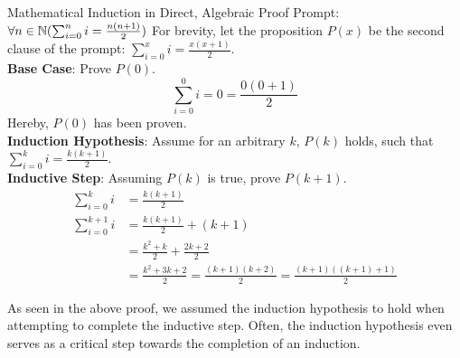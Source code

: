 \begin{ln-think}{Mathematical Induction in Direct, Algebraic Proof}{}
    Prompt: $\forall n \in \mathbb{N} (\sum_{i = 0}^{n} {i} = \frac{n(n + 1)}{2})$
    \tcblower
    For brevity, let the proposition $P(x)$ be the second clause of the prompt: $\sum_{i = 0}^{x} {i} = \frac{x(x + 1)}{2}$. \\
    \textbf{Base Case}: Prove $P(0)$.
    \[\sum_{i = 0}^{0} {i} = 0 = \frac{0(0 + 1)}{2}\]
    Hereby, $P(0)$ has been proven. \\
    \textbf{Induction Hypothesis}: Assume for an arbitrary $k$, $P(k)$ holds, such that $\sum_{i = 0}^{k} {i} = \frac{k(k + 1)}{2}$. \\
    \textbf{Inductive Step}: Assuming $P(k)$ is true, prove $P(k + 1)$.
    \begin{align*}
        \sum_{i = 0}^{k} {i} &= \frac{k(k + 1)}{2} \\
        \sum_{i = 0}^{k + 1} {i} &= \frac{k(k + 1)}{2} + (k + 1) \\
        &= \frac{k^2 + k}{2} + \frac{2k + 2}{2} \\
        &= \frac{k^2 + 3k + 2}{2} = \frac{(k + 1)(k + 2)}{2} = \frac{(k + 1)((k + 1) + 1)}{2}
    \end{align*}
\end{ln-think}
As seen in the above proof, we assumed the induction hypothesis to hold when attempting to complete the inductive step. Often, the induction hypothesis even serves as a critical step towards the completion of an induction.

